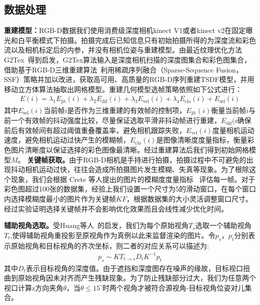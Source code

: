\subsection{数据处理}
\noindent\textbf{重建模型：}RGB-D数据我们使用消费级深度相机kinect V1或者kinect v2在固定曝光和白平衡模式下拍摄。拍摄完成后已知信息只有初始拍摄所得的为深度流和彩色流以及相机标定后的内参，并没有相机位姿与重建模型。由最近纹理优化方法G2Tex~\cite{fu2018texture}得到启发，G2Tex算法输入是深度相机扫描的深度图集合和彩色图集合，借助基于RGB-D三维重建算法~\cite{LongYang2018SurfaceRV}利用稀疏序列融合（Sparse-Sequence Fusion，SSF）策略并加以改进，获取高可用、高质量的RGB-D序列重建TSDF模型，并用移动立方体算法抽取出网格模型。重建几何模型选帧策略依照如下公式进行：
\begin{align}
E(i)= \lambda_{1} E_{\mathrm{jit}}(i)+\lambda_{2} E_{\mathrm{dif}}(i)+\lambda_{3} E_{\mathrm{vel}}(i)+\lambda_{4}E_{\mathrm{cla}}(i)+E_{\mathrm{sel}}(i)
\end{align}
其中$E_{\mathrm{sel}}(i)$当前帧$i$是否作为三维重建的有效帧的控制项，$E_{\mathrm{jit}}(i)$衡量当前帧$i$与前一个有效帧的抖动强度比较，尽量保证选取平滑非抖动帧进行重建，$E_{\mathrm{dif}}(i$确保前后有效帧间有超过阈值重叠覆盖率，避免相机跟踪失败，$E_{\mathrm{vel}}(i)$度量相机运动速度，避免相机运动过快产生的模糊帧，$E_{\mathrm{cla}}(i)$是图像清晰度度量指标，衡量彩色图片清晰度以保证选择的彩色图像最清晰。经过重建算法后我们得到初始网格模型$M$。
\noindent\textbf{关键帧获取。}由于RGB-D相机是手持进行拍摄，拍摄过程中不可避免的出现抖动相机运动过快，往往会造成所拍摄图片发生模糊、失真等现象。为了根除这个现象，我们会根据 Crete 等人提出的图片的模糊度度量指标 ~\cite{FrederiqueCrete2007TheBE}评估每一帧。对于彩色图超过100张的数据集，经验上我们设置一个尺寸为5的滑动窗口，在每个窗口内选择模糊度最小的图片作为关键帧$KF$，根据数据集的大小灵活调整窗口尺寸。经过实验证明选择关键帧并不会影响优化效果而且会线性减少优化时间。 \par
\noindent\textbf{辅助视角选取。}受Huang等人~\cite{JingweiHuang2020AdversarialTO}的启发，我们为每个原始视角$T_s$选取一个辅助视角$T_t$,使得辅助视角重投影至原视角作为真例以此来监督渲染的图片。令$p_s$，$p_t$分别表示原始视角和目标视角的齐次坐标，则二者的对应关系可以描述为:
\begin{align}
	p_s\sim KT_{t\rightarrow s}D_tK^{-1}p_t \label{work1:wrap}
\end{align}
其中$D_t$表示目标视角的深度值。由于遮挡和深度图存在噪声的缘故，目标视口扭曲到原始视角因未对齐而产生残缺现象。为了防止残缺部分过大，我们为任意两个视口计算z方向夹角$\theta$，当$\theta\le15^{\circ}$时两个视角才被符合源视角-目标视角位姿对儿集合。

